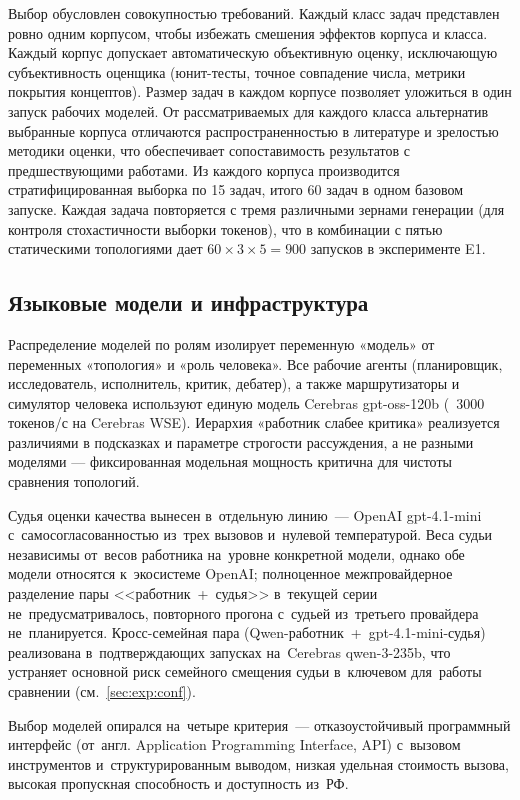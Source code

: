 Выбор обусловлен совокупностью требований. Каждый класс задач
представлен ровно одним корпусом, чтобы избежать смешения
эффектов корпуса и класса. Каждый корпус допускает автоматическую
объективную оценку, исключающую субъективность оценщика
(юнит-тесты, точное совпадение числа, метрики покрытия концептов).
Размер задач в каждом корпусе позволяет уложиться в один запуск
рабочих моделей. От рассматриваемых для каждого класса альтернатив
выбранные корпуса отличаются распространенностью в литературе и
зрелостью методики оценки, что обеспечивает сопоставимость
результатов с предшествующими работами. Из каждого корпуса
производится стратифицированная выборка по 15 задач, итого
60 задач в одном базовом запуске. Каждая задача повторяется
с тремя различными зернами генерации (для контроля стохастичности
выборки токенов), что в комбинации с пятью статическими топологиями
дает $60 \times 3 \times 5 = 900$ запусков в эксперименте E1.

\subsection{Языковые модели и инфраструктура}
\label{sec:meth:models}

Распределение моделей по ролям изолирует переменную «модель» от
переменных «топология» и «роль человека». Все рабочие агенты
(планировщик, исследователь, исполнитель, критик, дебатер), а также
маршрутизаторы и симулятор человека используют единую модель
Cerebras gpt-oss-120b (~3000 токенов/с на Cerebras WSE). Иерархия
«работник слабее критика» реализуется различиями в подсказках и
параметре строгости рассуждения, а не разными моделями ---
фиксированная модельная мощность критична для чистоты сравнения
топологий.

Судья оценки качества вынесен в~отдельную линию~--- OpenAI
gpt-4.1-mini с~самосогласованностью из~трех вызовов и~нулевой
температурой. Веса судьи независимы от~весов работника на~уровне
конкретной модели, однако обе модели относятся к~экосистеме
OpenAI; полноценное межпровайдерное разделение пары
<<работник~+~судья>> в~текущей серии не~предусматривалось,
повторного прогона с~судьей из~третьего провайдера не~планируется.
Кросс-семейная пара (Qwen-работник~+~gpt-4.1-mini-судья) реализована
в~подтверждающих запусках на~Cerebras qwen-3-235b, что устраняет
основной риск семейного смещения судьи в~ключевом для~работы
сравнении (см.~\ref{sec:exp:conf}).

Выбор моделей опирался на~четыре критерия~--- отказоустойчивый
программный интерфейс (от~англ. Application Programming Interface,
API) с~вызовом инструментов и~структурированным выводом, низкая
удельная стоимость вызова, высокая пропускная способность и
доступность из~РФ.

